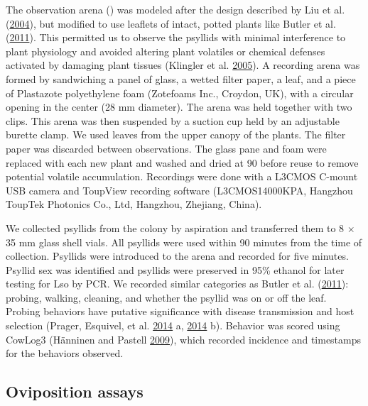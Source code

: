\documentclass[]{article}
\begin{document}
The observation arena () was modeled after the design described by Liu
et al. (\protect\hyperlink{ref-Liu2004}{2004}), but modified to use
leaflets of intact, potted plants like Butler et al.
(\protect\hyperlink{ref-Butler2011}{2011}). This permitted us to observe
the psyllids with minimal interference to plant physiology and avoided
altering plant volatiles or chemical defenses activated by damaging
plant tissues (Klingler et al.
\protect\hyperlink{ref-Klingler2005}{2005}). A recording arena was
formed by sandwiching a panel of glass, a wetted filter paper, a leaf,
and a piece of Plastazote polyethylene foam (Zotefoams Inc., Croydon,
UK), with a circular opening in the center (28 mm diameter). The arena
was held together with two clips. This arena was then suspended by a
suction cup held by an adjustable burette clamp. We used leaves from the
upper canopy of the plants. The filter paper was discarded between
observations. The glass pane and foam were replaced with each new plant
and washed and dried at 90 before reuse to remove potential volatile
accumulation. Recordings were done with a L3CMOS C-mount USB camera and
ToupView recording software (L3CMOS14000KPA, Hangzhou ToupTek Photonics
Co., Ltd, Hangzhou, Zhejiang, China).

We collected psyllids from the colony by aspiration and transferred them
to 8 \(\times\) 35 mm glass shell vials. All psyllids were used within
90 minutes from the time of collection. Psyllids were introduced to the
arena and recorded for five minutes. Psyllid sex was identified and
psyllids were preserved in 95\% ethanol for later testing for Lso by
PCR. We recorded similar categories as Butler et al.
(\protect\hyperlink{ref-Butler2011}{2011}): probing, walking, cleaning,
and whether the psyllid was on or off the leaf. Probing behaviors have
putative significance with disease transmission and host selection
(Prager, Esquivel, et al. \protect\hyperlink{ref-Prager2014a}{2014} a,
\protect\hyperlink{ref-Prager2014b}{2014} b). Behavior was scored using
CowLog3 (Hänninen and Pastell
\protect\hyperlink{ref-Haenninen2009}{2009}), which recorded incidence
and timestamps for the behaviors observed.

\hypertarget{sec:fecundity}{%
\subsection{Oviposition assays}\label{sec:fecundity}}
\end{document}
